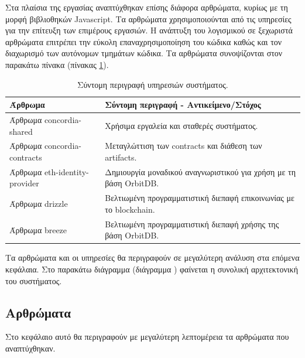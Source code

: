 Στα πλαίσια της εργασίας αναπτύχθηκαν επίσης διάφορα αρθρώματα, κυρίως με τη μορφή βιβλιοθηκών Javascript. Τα αρθρώματα χρησιμοποιούνται από τις υπηρεσίες για την επίτευξη των επιμέρους εργασιών. Η ανάπτυξη του λογισμικού σε ξεχωριστά αρθρώματα επιτρέπει την εύκολη επαναχρησιμοποίηση του κώδικα καθώς και τον διαχωρισμό των αυτόνομων τμημάτων κώδικα. Τα αρθρώματα συνοψίζονται στον παρακάτω πίνακα (πίνακας \ref{table:4-4-software-units-summary}).

\begin{table}[H]
    \begin{center}
        \begin{tabularx}{\textwidth}{l X}
            \toprule
            \textbf{Άρθρωμα} & \textbf{Σύντομη περιγραφή - Αντικείμενο/Στόχος} \\
            \midrule
            Άρθρωμα concordia-shared      & Χρήσιμα εργαλεία και σταθερές συστήματος. \\ [0.5ex]
            Άρθρωμα concordia-contracts   & Μεταγλώττιση των contracts και διάθεση των artifacts. \\ [0.5ex]
            Άρθρωμα eth-identity-provider & Δημιουργία μοναδικού αναγνωριστικού για χρήση με τη βάση OrbitDB. \\ [0.5ex]
            Άρθρωμα drizzle               & Βελτιωμένη προγραμματιστική διεπαφή επικοινωνίας με το blockchain. \\ [0.5ex]
            Άρθρωμα breeze                & Βελτιωμένη προγραμματιστική διεπαφή χρήσης της βάση OrbitDB. \\ [0.5ex]
            \bottomrule
        \end{tabularx}
    \end{center}
    \caption{Σύντομη περιγραφή υπηρεσιών συστήματος.}
    \label{table:4-4-software-units-summary}
\end{table}

Τα αρθρώματα και οι υπηρεσίες θα περιγραφούν σε μεγαλύτερη ανάλυση στα επόμενα κεφάλαια. Στο παρακάτω διάγραμμα (διάγραμμα ) φαίνεται η συνολική αρχιτεκτονική του συστήματος.


\subsection{Αρθρώματα} \label{subsection:4-4-software-units}

Στο κεφάλαιο αυτό θα περιγραφούν με μεγαλύτερη λεπτομέρεια τα αρθρώματα που αναπτύχθηκαν.

